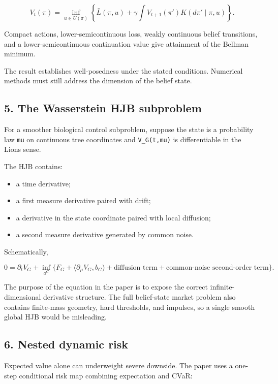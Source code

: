 \[
V_t(\pi)=\inf_{u\in U(\pi)}
\left\{\bar L(\pi,u)+\gamma\int V_{t+1}(\pi')K(d\pi'\mid\pi,u)\right\}.
\]

Compact actions, lower-semicontinuous loss, weakly continuous belief
transitions, and a lower-semicontinuous continuation value give attainment of
the Bellman minimum.

The result establishes well-posedness under the stated conditions. Numerical
methods must still address the dimension of the belief state.

\subsection{5. The Wasserstein HJB subproblem}\label{the-wasserstein-hjb-subproblem}

For a smoother biological control subproblem, suppose the state is a probability
law \texttt{mu} on continuous tree coordinates and \texttt{V\_G(t,mu)} is differentiable in the
Lions sense.

The HJB contains:

\begin{itemize}
\tightlist
\item
  a time derivative;
\item
  a first measure derivative paired with drift;
\item
  a derivative in the state coordinate paired with local diffusion;
\item
  a second measure derivative generated by common noise.
\end{itemize}

Schematically,

\[
0=\partial_tV_G+
\inf_{a^G}\{F_G+\langle\partial_\mu V_G,b_G\rangle
+\text{diffusion term}+\text{common-noise second-order term}\}.
\]

The purpose of the equation in the paper is to expose the correct infinite-
dimensional derivative structure. The full belief-state market problem also
contains finite-mass geometry, hard thresholds, and impulses, so a single
smooth global HJB would be misleading.

\subsection{6. Nested dynamic risk}\label{nested-dynamic-risk}

Expected value alone can underweight severe downside. The paper uses a
one-step conditional risk map combining expectation and CVaR:

